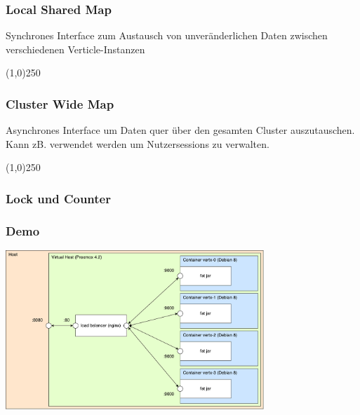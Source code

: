 \documentclass{beamer}
\begin{document}
\begin{frame}
  \frametitle{Local Shared Map}

  Synchrones Interface zum Austausch von unveränderlichen Daten
  zwischen verschiedenen Verticle-Instanzen

  \vspace{.3cm}
  \line(1,0){250}
  \vspace{.3cm}

  
\end{frame}


\begin{frame}
  \frametitle{Cluster Wide Map}
  \vspace{.5cm}

  Asynchrones Interface um Daten quer über den gesamten Cluster auszutauschen.
  Kann zB. verwendet werden um Nutzersessions zu verwalten.

  \vspace{.3cm}
  \line(1,0){250}
  \vspace{.3cm}

  
\end{frame}


\begin{frame}
  \frametitle{Lock und Counter}
  \vspace{1cm}

  
\end{frame}


\begin{frame}
  \frametitle{Demo}
  \vspace{1cm}

  \includegraphics[height=6cm]{src/demo.pdf}
\end{frame}
\end{document}
